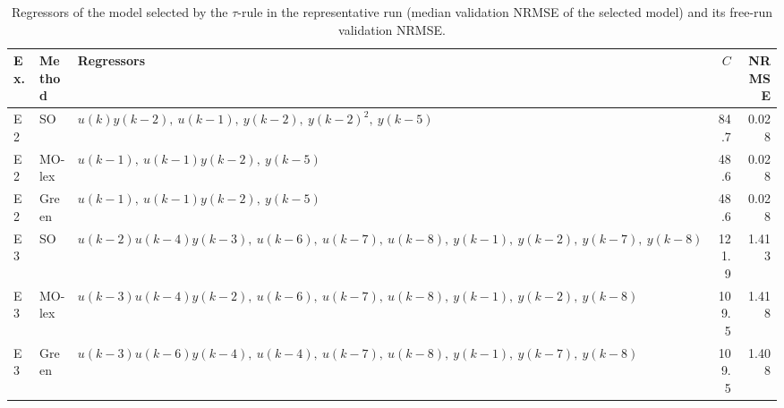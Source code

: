 \begin{table}[!htbp]
\centering
\caption{Regressors of the model selected by the $\tau$-rule in the representative run (median validation NRMSE of the selected model) and its free-run validation NRMSE.}
\label{tab:models_K}
\setlength{\tabcolsep}{3pt}
\footnotesize
\begin{tabular}{llp{8.5cm}rr}
\toprule
Ex. & Method & Regressors & $C$ & NRMSE \\
\midrule
E2 & SO & $u(k) y(k-2),\ u(k-1),\ y(k-2),\ y(k-2)^{2},\ y(k-5)$ & 84.7 & 0.028 \\
E2 & MO-lex & $u(k-1),\ u(k-1) y(k-2),\ y(k-5)$ & 48.6 & 0.028 \\
E2 & Green & $u(k-1),\ u(k-1) y(k-2),\ y(k-5)$ & 48.6 & 0.028 \\
\midrule
E3 & SO & $u(k-2) u(k-4) y(k-3),\ u(k-6),\ u(k-7),\ u(k-8),\ y(k-1),\ y(k-2),\ y(k-7),\ y(k-8)$ & 121.9 & 1.413 \\
E3 & MO-lex & $u(k-3) u(k-4) y(k-2),\ u(k-6),\ u(k-7),\ u(k-8),\ y(k-1),\ y(k-2),\ y(k-8)$ & 109.5 & 1.418 \\
E3 & Green & $u(k-3) u(k-6) y(k-4),\ u(k-4),\ u(k-7),\ u(k-8),\ y(k-1),\ y(k-7),\ y(k-8)$ & 109.5 & 1.408 \\
\bottomrule
\end{tabular}
\end{table}
